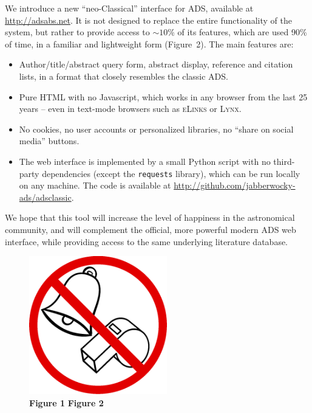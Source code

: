 \documentclass[12pt]{article}
\begin{document}
We introduce a new ``neo-Classical'' interface for ADS, available at \url{http://adsabs.net}. It is not designed to replace the entire functionality of the system, but rather to provide access to $\sim 10$\% of its features, which are used 90\% of time, in a familiar and lightweight form (Figure~2). The main features are:
\begin{itemize}
\item Author/title/abstract query form, abstract display, reference and citation lists, in a format that closely resembles the classic ADS.
\item Pure HTML with no Javascript, which works in any browser from the last 25 years -- even in text-mode browsers such as \textsc{eLinks} or \textsc{Lynx}.
\item No cookies, no user accounts or personalized libraries, no ``share on social media'' buttons.
\item The web interface is implemented by a small Python script with no third-party dependencies (except the \texttt{requests} library), which can be run locally on any machine. The code is available at \url{http://github.com/jabberwocky-ads/adsclassic}.
\end{itemize}

We hope that this tool will increase the level of happiness in the astronomical community, and will complement the official, more powerful modern ADS web interface, while providing access to the same underlying literature database.

\begin{figure}[t]
\makebox[20mm]{}\includegraphics[width=6cm]{sign.png}\\
\makebox[33mm]{}\textbf{Figure 1}
\makebox[62mm]{}\textbf{Figure 2}
\end{figure}
\end{document}
